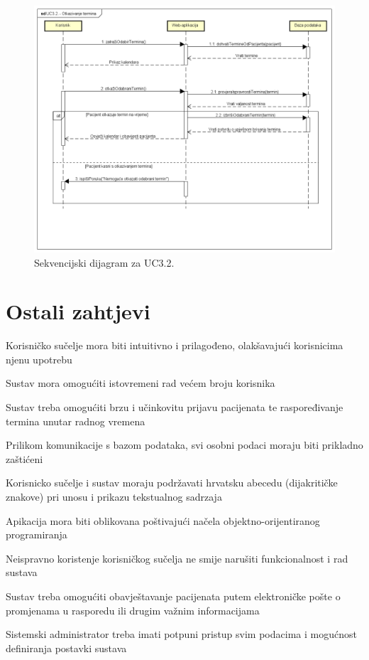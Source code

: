 				\begin{figure}[H]
					\includegraphics[scale=0.5]{slike/UC3.2_Otkazivanje_termina}
					\centering
					\caption{Sekvencijski dijagram za UC3.2.}
				\end{figure}
				
				\newpage
				
		\section{Ostali zahtjevi}
		
		 	\begin{packed_item}
		 		\item Korisničko sučelje mora biti intuitivno i prilagođeno, olakšavajući korisnicima njenu upotrebu
		 		\item Sustav mora omogućiti istovremeni rad većem broju korisnika
		 		\item Sustav treba omogućiti brzu i učinkovitu prijavu pacijenata te raspoređivanje termina unutar radnog vremena
		 		\item Prilikom komunikacije s bazom podataka, svi osobni podaci moraju biti prikladno zaštićeni
		 		\item Korisnicko sučelje i sustav moraju podržavati hrvatsku abecedu (dijakritičke znakove) pri unosu i prikazu tekstualnog sadrzaja 
		 		\item Apikacija mora biti oblikovana poštivajući načela objektno-orijentiranog programiranja
		 		\item Neispravno koristenje korisničkog sučelja ne smije narušiti funkcionalnost i rad sustava
		 		\item Sustav treba omogućiti obavještavanje pacijenata putem elektroničke pošte o promjenama u rasporedu ili drugim važnim informacijama
		 		\item Sistemski administrator treba imati potpuni pristup svim podacima i mogućnost definiranja postavki sustava
		 	\end{packed_item}
			 
			 
			 
	
